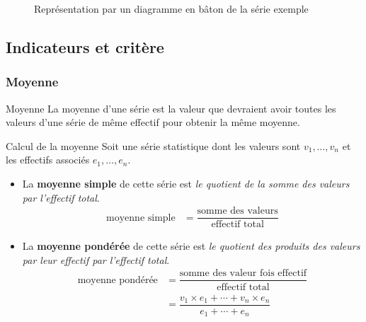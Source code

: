 \documentclass[titre=Stastistiques, classe=Troisième]{jeanmonnet}
\begin{document}
\begin{figure}[H]
\centering
	\caption{Représentation par un diagramme en bâton de la série exemple}
\end{figure}

\subsection{Indicateurs et critère}
\subsubsection{Moyenne}

\begin{definition}{Moyenne}{}
	La moyenne d'une série est la valeur que devraient avoir toutes les valeurs d'une série de même effectif pour obtenir la même moyenne.
\end{definition}

\begin{propriete}{Calcul de la moyenne}{}
	Soit une série statistique dont les valeurs sont $v_1, \dots, v_n$ et les effectifs associés $e_1, \dots, e_n$.
	\begin{itemize}
		\item La \textbf{moyenne simple} de cette série est \emph{le quotient de la somme des valeurs par l'effectif total}.
		\begin{align*}
			\mbox{moyenne simple}
			& = \dfrac{\mbox{somme des valeurs}}{\mbox{effectif total}}
		\end{align*}
		\item La \textbf{moyenne pondérée} de cette série est \emph{le quotient des produits des valeurs par leur effectif par l'effectif total}.
		\begin{align*}	
			\mbox{moyenne pondérée}
			& = \dfrac{\mbox{somme des valeur fois effectif}}{\mbox{effectif total}}\\
			& = \dfrac{v_1\times e_1 + \cdots + v_n\times e_n}{e_1 + \cdots + e_n}
		\end{align*}
	\end{itemize}
\end{propriete}
\end{document}
